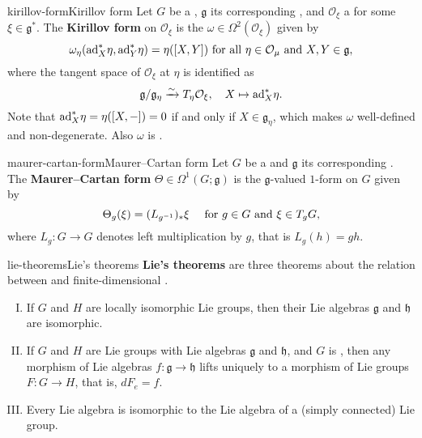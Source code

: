 \begin{topic}{kirillov-form}{Kirillov form}
    Let $G$ be a , $\mathfrak{g}$ its corresponding , and $\mathcal{O}_\xi$ a  for some $\xi \in \mathfrak{g}^*$. The \textbf{Kirillov form} on $\mathcal{O}_\xi$ is the  $\omega \in \Omega^2(\mathcal{O}_\xi)$ given by
    \[ \omega_\eta(\textup{ad}_X^* \eta, \textup{ad}_Y^* \eta) = \eta([X, Y]) \textup{ for all } \eta \in \mathcal{O}_\mu \textup{ and } X, Y \in \mathfrak{g} , \]
    where the tangent space of $\mathcal{O}_\xi$ at $\eta$ is identified as
    \[ \mathfrak{g}/\mathfrak{g}_\eta \xrightarrow{\sim} T_\eta \mathcal{O}_\xi, \quad X \mapsto \textup{ad}_X^* \eta . \]
    Note that $\textup{ad}_X^* \eta = \eta([X, -]) = 0$ if and only if $X \in \mathfrak{g}_\eta$, which makes $\omega$ well-defined and non-degenerate. Also $\omega$ is .
\end{topic}

\begin{topic}{maurer-cartan-form}{Maurer--Cartan form}
    Let $G$ be a  and $\mathfrak{g}$ its corresponding . The \textbf{Maurer--Cartan form} $\Theta \in \Omega^1(G; \mathfrak{g})$ is the $\mathfrak{g}$-valued $1$-form on $G$ given by
    \[ \Theta_g(\xi) = (L_{g^{-1}})_* \xi \quad \textup{ for } g \in G \textup{ and } \xi \in T_g G, \]
    where $L_g : G \to G$ denotes left multiplication by $g$, that is $L_g(h) = gh$.
\end{topic}

\begin{topic}{lie-theorems}{Lie's theorems}
    \textbf{Lie's theorems} are three theorems about the relation between  and finite-dimensional .
    \begin{enumerate}[(I)]
        \item If $G$ and $H$ are locally isomorphic Lie groups, then their Lie algebras $\mathfrak{g}$ and $\mathfrak{h}$ are isomorphic.
        \item If $G$ and $H$ are Lie groups with Lie algebras $\mathfrak{g}$ and $\mathfrak{h}$, and $G$ is , then any morphism of Lie algebras $f : \mathfrak{g} \to \mathfrak{h}$ lifts uniquely to a morphism of Lie groups $F : G \to H$, that is, $dF_e = f$.
        \item Every Lie algebra is isomorphic to the Lie algebra of a (simply connected) Lie group.
    \end{enumerate}
\end{topic}

